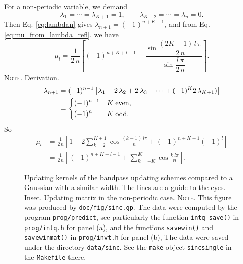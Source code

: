 \documentclass[reprint, floatfix]{revtex4-1}
\newcommand{\note}[1]{{\color{DarkGreen}\footnotesize \textsc{Note.} #1}}
\begin{document}
For a non-periodic variable, we demand
$$
\lambda_1 = \cdots = \lambda_{K+1} = 1,
\qquad
\lambda_{K+2} = \cdots = \lambda_n = 0.
$$
Then Eq. \eqref{eq:lambdan} gives
$\lambda_{n+1} = (-1)^{n+K-1}$,
and from Eq. \eqref{eq:mu_from_lambda_refl},
we have
\begin{equation}
  \mu_l
  =
  \frac{1}{2 \, n}
  \left[
    (-1)^{n+K+l-1}
    +
    \frac{
      \sin
      \dfrac{ (2 K + 1) \, l \, \pi }
           {         2 \, n        }
    }
    {
      \sin \dfrac{ l \, \pi } { 2 \, n }
    }
  \right]
  .
\label{eq:mu_sinc_refl}
\end{equation}
\note{Derivation.
$$
\begin{aligned}
  \lambda_{n+1}
  &=
  (-1)^{n-1}
  \left[
    \lambda_1
    - 2 \, \lambda_2
    + 2 \, \lambda_3 - \cdots
    + (-1)^{K} 2 \, \lambda_{K+1})
  \right]
  \\
  &=
  \begin{dcases}
    (-1)^{n-1} & K \mathrm{\; even,} \\
    (-1)^n     & K \mathrm{\; odd.}
  \end{dcases}
\end{aligned}
$$
So
$$
\begin{aligned}
  \mu_l
  &=
  \frac{1}{2\,n}
  \left[
    1 +
    2 \sum_{k=2}^{K+1}
    \cos \frac { (k - 1) \, l \pi } { n }
    +
    (-1)^{n+K-1} (-1)^l
  \right]
  \\
  &=
  \frac{1}{2\,n}
  \left[
    (-1)^{n+K+l-1}
    +
    \sum_{k=-K}^{K}
    \cos \frac { k \, l \pi } { n }
  \right]
  .
\end{aligned}
$$
}%


\begin{figure}[h]
\begin{center}
  \caption{
    \label{fig:sinc}
    Updating kernels of the bandpass updating schemes
    compared to a Gaussian with a similar width.
    The lines are a guide to the eyes.
    Inset. Updating matrix in the non-periodic case.
    \note{This figure was produced by \texttt{doc/fig/sinc.gp}.
      The data were computed by the program \texttt{prog/predict},
      see particularly the function \texttt{intq\_save()}
      in \texttt{prog/intq.h} for panel (a),
      and the functions \texttt{savewin()}
      and \texttt{savewinmat()}
      in \texttt{prog/invt.h} for panel (b),
      The data were saved under the directory \texttt{data/sinc}.
      See the \texttt{make} object \texttt{sincsingle}
      in the \texttt{Makefile} there.
    }%
  }
\end{center}
\end{figure}
\end{document}
